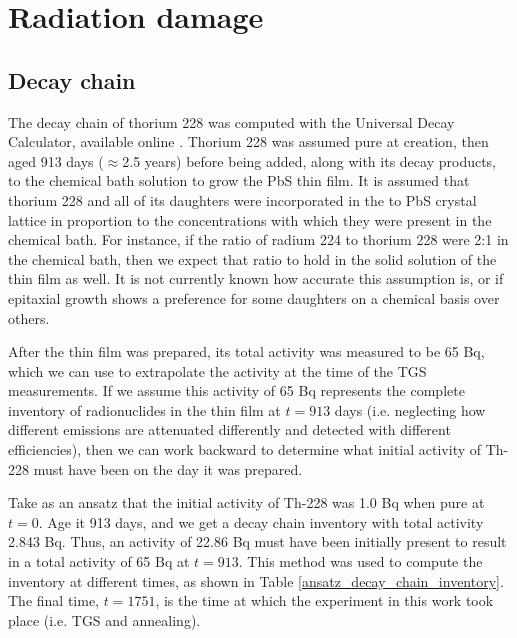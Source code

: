 \section{Radiation damage}
\subsection{Decay chain}
The decay chain of thorium 228 was computed with the Universal Decay Calculator, available online \cite{wise_calculator}. Thorium 228 was assumed pure at creation, then aged 913 days ($\approx$2.5 years) before being added, along with its decay products, to the chemical bath solution to grow the PbS thin film. It is assumed that thorium 228 and all of its daughters were incorporated in the to PbS crystal lattice in proportion to the concentrations with which they were present in the chemical bath. For instance, if the ratio of radium 224 to thorium 228 were 2:1 in the chemical bath, then we expect that ratio to hold in the solid solution of the thin film as well. It is not currently known how accurate this assumption is, or if epitaxial growth shows a preference for some daughters on a chemical basis over others.

After the thin film was prepared, its total activity was measured to be 65 Bq, which we can use to extrapolate the activity at the time of the TGS measurements. If we assume this activity of 65 Bq represents the complete inventory of radionuclides in the thin film at $t = 913$ days (i.e. neglecting how different emissions are attenuated differently and detected with different efficiencies), then we can work backward to determine what initial activity of Th-228 must have been on the day it was prepared.

Take as an ansatz that the initial activity of Th-228 was 1.0 Bq when pure at $t=0$. Age it 913 days, and we get a decay chain inventory with total activity 2.843 Bq. Thus, an activity of 22.86 Bq must have been initially present to result in a total activity of 65 Bq at $t=913$. This method was used to compute the inventory at different times, as shown in Table \ref{ansatz_decay_chain_inventory}. The final time, $t=1751$, is the time at which the experiment in this work took place (i.e. TGS and annealing).

